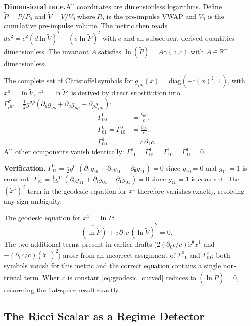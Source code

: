 \documentclass[12pt,a4paper]{article}
\begin{document}
\textbf{Dimensional note.}\quad All coordinates are dimensionless logarithms.
Define $\tilde{P}=P/P_0$ and $\tilde{V}=V/V_0$ where $P_0$ is the pre-impulse
VWAP and $V_0$ is the cumulative pre-impulse volume. The metric then reads
$ds^2 = c^2(d\ln\tilde{V})^2-(d\ln\tilde{P})^2$ with $c$ and all subsequent
derived quantities dimensionless. The invariant $A$ satisfies
$\ln(\tilde{P})=A\gamma(v,c)$ with $A\in\mathbb{R}^+$ dimensionless.

The complete set of Christoffel symbols for
$g_{\mu\nu}(x)=\mathrm{diag}(-c(x)^2,\,1)$,
with $x^0=\ln\tilde{V}$, $x^1=\ln\tilde{P}$,
is derived by direct substitution into
$\Gamma^\sigma_{\mu\nu}=\frac{1}{2}g^{\sigma\rho}
(\partial_\mu g_{\nu\rho}+\partial_\nu g_{\mu\rho}-\partial_\rho g_{\mu\nu})$:
\begin{align}
    \Gamma^0_{00} &= \frac{\partial_0 c}{c}, \label{eq:G000}\\
    \Gamma^0_{01} = \Gamma^0_{10} &= \frac{\partial_1 c}{c}, \label{eq:G001}\\
    \Gamma^1_{00} &= c\,\partial_1 c. \label{eq:G100}
\end{align}
All other components vanish identically:
$\Gamma^0_{11}=\Gamma^1_{01}=\Gamma^1_{10}=\Gamma^1_{11}=0$.

\textbf{Verification.}
$\Gamma^0_{11}=\tfrac{1}{2}g^{00}(\partial_1 g_{10}+\partial_1 g_{10}-\partial_0 g_{11})=0$
since $g_{10}=0$ and $g_{11}=1$ is constant.
$\Gamma^1_{01}=\tfrac{1}{2}g^{11}(\partial_0 g_{11}+\partial_1 g_{01}-\partial_1 g_{01})=0$
since $g_{11}=1$ is constant.
The $(\dot{x}^1)^2$ term in the geodesic equation for $x^1$
therefore vanishes exactly, resolving any sign ambiguity.

The geodesic equation for $x^1=\ln\tilde{P}$:
\begin{equation}
    \label{eq:geodesic_curved}
    \ddot{(\ln\tilde{P})} + c\,\partial_1 c\,\dot{(\ln\tilde{V})}^2 = 0.
\end{equation}
The two additional terms present in earlier drafts
($2(\partial_0 c/c)\dot{x}^0\dot{x}^1$ and $-(\partial_1 c/c)(\dot{x}^1)^2$)
arose from an incorrect assignment of $\Gamma^0_{11}$ and $\Gamma^1_{01}$;
both symbols vanish for this metric and the correct equation contains
a single non-trivial term.
When $c$ is constant \eqref{eq:geodesic_curved} reduces to
$\ddot{(\ln\tilde{P})}=0$, recovering the flat-space result exactly.

\subsection{The Ricci Scalar as a Regime Detector}
\end{document}
